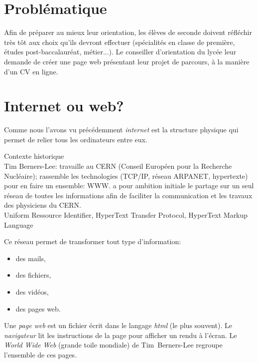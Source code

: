 \documentclass[a4paper,11pt]{article}
\begin{document}
\begin{Form}
\section{Problématique}
Afin de préparer au mieux leur orientation, les élèves de seconde doivent réfléchir très tôt aux choix qu'ils devront effectuer (spécialités en classe de première, études post-baccalauréat, métier...). Le conseiller d'orientation du lycée leur demande de créer une page web présentant leur projet de parcours, à la manière d'un CV en ligne.
\section{Internet ou web?}
Comme nous l'avons vu précédemment \emph{internet} est la structure physique qui permet de relier tous les ordinateurs entre eux.
\begin{commentprof}
Contexte historique\\
Tim Berners-Lee: travaille au CERN (Conseil Européen pour la Recherche Nucléaire); rassemble les technologies (TCP/IP, réseau ARPANET, hypertexte) pour en faire un ensemble: WWW. a pour ambition initiale le partage sur un seul réseau de toutes les informations afin de faciliter la communication et les travaux des physiciens du CERN.\\
Uniform Ressource Identifier, HyperText Transfer Protocol, HyperText Markup Language
\end{commentprof}

Ce réseau permet de transformer tout type d'information:
\begin{itemize}
\item des mails,
\item des fichiers,
\item des vidéos,
\item des pages web.
\end{itemize}
Une \emph{page web} est un fichier écrit dans le langage \emph{html} (le plus souvent). Le \emph{navigateur} lit les instructions de la page pour afficher un rendu à l'écran.
Le \emph{World Wide Web} (grande toile mondiale) de Tim~Berners-Lee regroupe l'ensemble de ces pages.

\end{Form}
\end{document}
